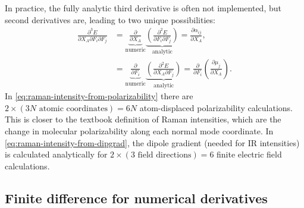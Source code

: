 \documentclass[%
class = book,%
crop = false,%
float = true,%
multi = true,%
preview = false,%
]{standalone}
\let\cite\autocite
\begin{document}
In practice, the fully analytic third derivative is often not implemented, but second derivatives are, leading to two unique possibilities:
\begin{align}
  \label{eq:raman-intensity-from-polarizability}
  \frac{\partial^{3} E}{\partial X_{A} \partial F_{i} \partial F_{j}} &= \underbrace{\frac{\partial}{\partial X_{A}}}_{\text{numeric}} \underbrace{\left(\frac{\partial^{2} E}{\partial F_{i} \partial F_{j}}\right)}_{\text{analytic}} = \frac{\partial \alpha_{ij}}{\partial X_{A}}, \\
  \label{eq:raman-intensity-from-dipgrad}
  &= \underbrace{\frac{\partial}{\partial F_{i}}}_{\text{numeric}} \underbrace{\left(\frac{\partial^{2} E}{\partial X_{A} \partial F_{j}}\right)}_{\text{analytic}} = \frac{\partial}{\partial F_{i}} \left( \frac{\partial \mu_{j}}{\partial X_{A}} \right).
\end{align}
In \eqref{eq:raman-intensity-from-polarizability} there are \(2 \times (3N \,\,\text{atomic coordinates}) = 6N\) atom-displaced polarizability calculations. This is closer to the textbook definition of Raman intensities, which are the change in molecular polarizability along each normal mode coordinate\cite{doi:10.1080/00268978000103541}. In \eqref{eq:raman-intensity-from-dipgrad}, the dipole gradient (needed for IR intensities) is calculated analytically for \(2 \times (3 \,\,\text{field directions}) = 6\) finite electric field calculations.

\subsection{Finite difference for numerical derivatives}
\label{ssec:finite-difference-for-numerical-derivatives}

\end{document}
